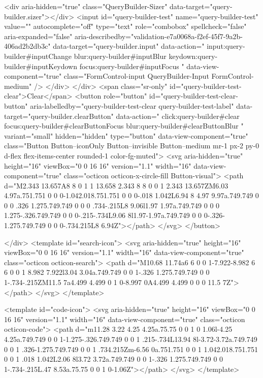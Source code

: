            <div aria-hidden="true" class="QueryBuilder-Sizer" data-target="query-builder.sizer"></div>
            <input id="query-builder-test" name="query-builder-test" value="" autocomplete="off" type="text" role="combobox" spellcheck="false" aria-expanded="false" aria-describedby="validation-e7a0068a-f2ef-45f7-9a2b-406ad2b2db3c" data-target="query-builder.input" data-action="
          input:query-builder#inputChange
          blur:query-builder#inputBlur
          keydown:query-builder#inputKeydown
          focus:query-builder#inputFocus
        " data-view-component="true" class="FormControl-input QueryBuilder-Input FormControl-medium" />
          </div>
        </div>
          <span class="sr-only" id="query-builder-test-clear">Clear</span>
          <button role="button" id="query-builder-test-clear-button" aria-labelledby="query-builder-test-clear query-builder-test-label" data-target="query-builder.clearButton" data-action="
                click:query-builder#clear
                focus:query-builder#clearButtonFocus
                blur:query-builder#clearButtonBlur
              " variant="small" hidden="hidden" type="button" data-view-component="true" class="Button Button--iconOnly Button--invisible Button--medium mr-1 px-2 py-0 d-flex flex-items-center rounded-1 color-fg-muted">  <svg aria-hidden="true" height="16" viewBox="0 0 16 16" version="1.1" width="16" data-view-component="true" class="octicon octicon-x-circle-fill Button-visual">
    <path d="M2.343 13.657A8 8 0 1 1 13.658 2.343 8 8 0 0 1 2.343 13.657ZM6.03 4.97a.751.751 0 0 0-1.042.018.751.751 0 0 0-.018 1.042L6.94 8 4.97 9.97a.749.749 0 0 0 .326 1.275.749.749 0 0 0 .734-.215L8 9.06l1.97 1.97a.749.749 0 0 0 1.275-.326.749.749 0 0 0-.215-.734L9.06 8l1.97-1.97a.749.749 0 0 0-.326-1.275.749.749 0 0 0-.734.215L8 6.94Z"></path>
</svg>
</button>

      </div>
      <template id="search-icon">
  <svg aria-hidden="true" height="16" viewBox="0 0 16 16" version="1.1" width="16" data-view-component="true" class="octicon octicon-search">
    <path d="M10.68 11.74a6 6 0 0 1-7.922-8.982 6 6 0 0 1 8.982 7.922l3.04 3.04a.749.749 0 0 1-.326 1.275.749.749 0 0 1-.734-.215ZM11.5 7a4.499 4.499 0 1 0-8.997 0A4.499 4.499 0 0 0 11.5 7Z"></path>
</svg>
</template>

<template id="code-icon">
  <svg aria-hidden="true" height="16" viewBox="0 0 16 16" version="1.1" width="16" data-view-component="true" class="octicon octicon-code">
    <path d="m11.28 3.22 4.25 4.25a.75.75 0 0 1 0 1.06l-4.25 4.25a.749.749 0 0 1-1.275-.326.749.749 0 0 1 .215-.734L13.94 8l-3.72-3.72a.749.749 0 0 1 .326-1.275.749.749 0 0 1 .734.215Zm-6.56 0a.751.751 0 0 1 1.042.018.751.751 0 0 1 .018 1.042L2.06 8l3.72 3.72a.749.749 0 0 1-.326 1.275.749.749 0 0 1-.734-.215L.47 8.53a.75.75 0 0 1 0-1.06Z"></path>
</svg>
</template>

